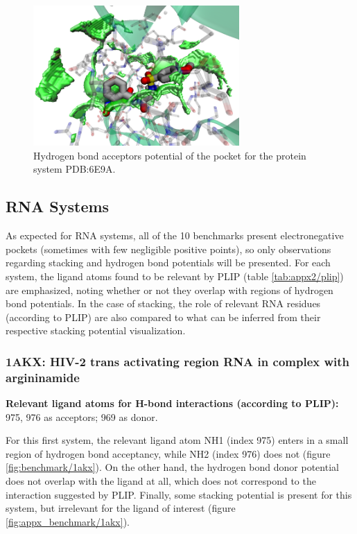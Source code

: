       \begin{figure}[H]
        \centering
        \includegraphics[width=0.7\textwidth]{figures/results/benchmark_prot/6e9a.png}
        \caption{\label{fig:benchmark/6e9a} Hydrogen bond acceptors potential of the pocket for the protein system PDB:6E9A.}
      \end{figure}
    \pagebreak

  \subsection{RNA Systems}
    As expected for RNA systems, all of the 10 benchmarks present electronegative pockets (sometimes with few negligible positive points), so only observations regarding stacking and hydrogen bond potentials will be presented. For each system, the ligand atoms found to be relevant by PLIP (table \ref{tab:appx2/plip}) are emphasized, noting whether or not they overlap with regions of hydrogen bond potentials. In the case of stacking, the role of relevant RNA residues (according to PLIP) are also compared to what can be inferred from their respective stacking potential visualization.

    \subsubsection{1AKX: HIV-2 trans activating region RNA in complex with argininamide}
      \textbf{Relevant ligand atoms for H-bond interactions (according to PLIP):} 975, 976 as acceptors; 969 as donor.

      For this first system, the relevant ligand atom NH1 (index 975) enters in a small region of hydrogen bond acceptancy, while NH2 (index 976) does not (figure \ref{fig:benchmark/1akx}). On the other hand, the hydrogen bond donor potential does not overlap with the ligand at all, which does not correspond to the interaction suggested by PLIP. Finally, some stacking potential is present for this system, but irrelevant for the ligand of interest (figure \ref{fig:appx_benchmark/1akx}).

